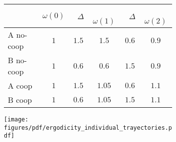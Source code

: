 \documentclass[a4paper,10pt]{article}
\newif\ifen
\newif\ifes
\newcommand{\en}[1]{\ifen#1 \fi}
\newcommand{\es}[1]{\ifes#1 \fi}
\begin{document}
\begin{figure}[ht!]
\vspace{-0.1cm}
\centering
 \begin{subfigure}[c]{0.50\textwidth}
 \centering
  \begin{tabular}{|l|c|c|c|c|c|}
     \hline
         & {\small $\omega(0)$} & {\small \  $\Delta$}  & {\small \, $\omega(1)$ } & {\small \  $\Delta$}  & {\small \,  $\omega(2)$ }  \\ \hline \hline
        A no-coop& $1$ & $1.5$ &  $1.5$ & $0.6$ & $\bm{0.9}$ \\ \hline
        B no-coop & $1$ & $0.6$ & $0.6$ & $1.5$ & $\bm{0.9}$ \\ \hline\hline
        A coop & $1$ & $1.5$ & $1.05$ & $0.6$ & $\bm{1.1}$ \\ \hline
        B coop & $1$ & $0.6$ & $1.05$ & $1.5$ & $\bm{1.1}$\\ \hline
\end{tabular}
 \end{subfigure}
 \begin{subfigure}[c]{0.45\textwidth}
\begin{flushright}
 \texttt{[image: figures/pdf/ergodicity\_individual\_trayectories.pdf]}
 \end{flushright}
 \end{subfigure}
 \caption{
 \en{Reducing fluctuations through cooperation allows individuals to reach growth rates they would never achieve alone.}%
 \es{Reducir fluctuaciones por cooperación le permite a los individuos alcanzar tasas de crecimiento que jamás obtendrían solos.}%
 \en{In the table (left) $\Delta$ represents the change in resources experienced by individuals at random.}%
 \es{En la tabla (izquierda) $\Delta$ representa el cambio en los recursos que sufren los individuos de forma aleatoria.}%
 \en{In the figure (right), the colored curves are the trajectories of individuals playing alone, and the black line is the trajectory of individuals playing in cooperative groups.}%
 \es{En la figura (derecha), las curvas de colores son las trayectorias de los individuos jugando solos, y la recta negra es la trayectoria de los individuos jugando en grupos cooperativos.}%
 }
 \label{fig:coop}
 \vspace{-0.1cm}
 \end{figure}

\end{document}
